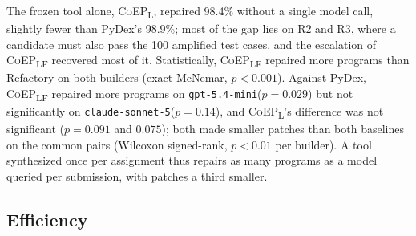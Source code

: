 \documentclass[acmsmall,screen,review,anonymous,nonacm]{acmart}
\newcommand{\coepL}{\textsc{CoEP}\textsubscript{L}\xspace}
\newcommand{\coepLF}{\textsc{CoEP}\textsubscript{LF}\xspace}
\newcommand{\cs}{\texttt{claude-sonnet-5}\xspace}
\newcommand{\gm}{\texttt{gpt-5.4-mini}\xspace}
\begin{document}
The frozen tool alone, \coepL, repaired 98.4\% without a single model call, slightly fewer than PyDex's 98.9\%; most of the gap lies on R2 and R3, where a candidate must also pass the 100 amplified test cases, and the escalation of \coepLF recovered most of it. Statistically, \coepLF repaired more programs than Refactory on both builders (exact McNemar, $p < 0.001$). Against PyDex, \coepLF repaired more programs on \gm ($p = 0.029$) but not significantly on \cs ($p = 0.14$), and \coepL's difference was not significant ($p = 0.091$ and $0.075$); both made smaller patches than both baselines on the common pairs (Wilcoxon signed-rank, $p < 0.01$ per builder). A tool synthesized once per assignment thus repairs as many programs as a model queried per submission, with patches a third smaller.

\subsection{Efficiency}
\label{sec:rq-cost}
\end{document}
